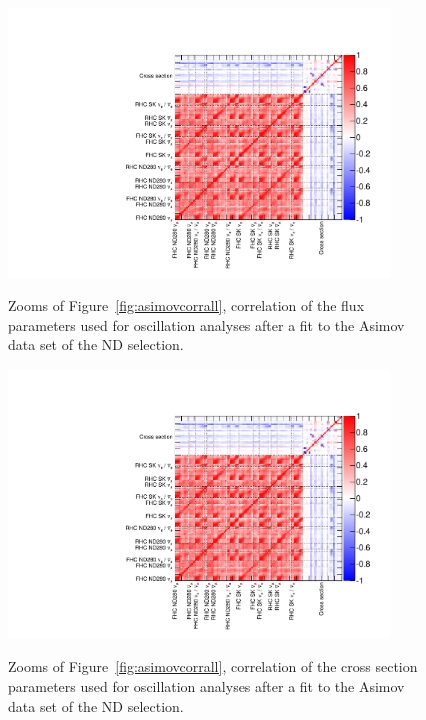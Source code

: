 \begin{figure}[ht]
  \begin{center}
    \includegraphics[width=0.9\textwidth,page=4]{images/BANFF/OutputAsimov_matrices.pdf}\\
    \caption[Correlation of the flux parameters used for oscillation
    analyses after a fit to the Asimov data set of the ND280
    selection]{Zooms of Figure~\ref{fig:asimovcorrall}, correlation of
      the flux parameters used for oscillation analyses after a fit to
      the \Gls{Asimov} data set of the \Gls{ND}
      selection.}
    \label{fig:asimovcorrflux}
  \end{center}
\end{figure}

\begin{figure}[ht]
  \begin{center}
    \includegraphics[width=0.9\textwidth,page=2]{images/BANFF/OutputAsimov_matrices.pdf}\\
    \caption[Correlation of the cross section parameters used for
    oscillation analyses after a fit to the Asimov data set of the
    ND280 selection]{Zooms of Figure~\ref{fig:asimovcorrall},
      correlation of the cross section parameters used for oscillation
      analyses after a fit to the \Gls{Asimov} data set of the
      \Gls{ND} selection.}
    \label{fig:asimovcorrxsec}
  \end{center}
\end{figure}

